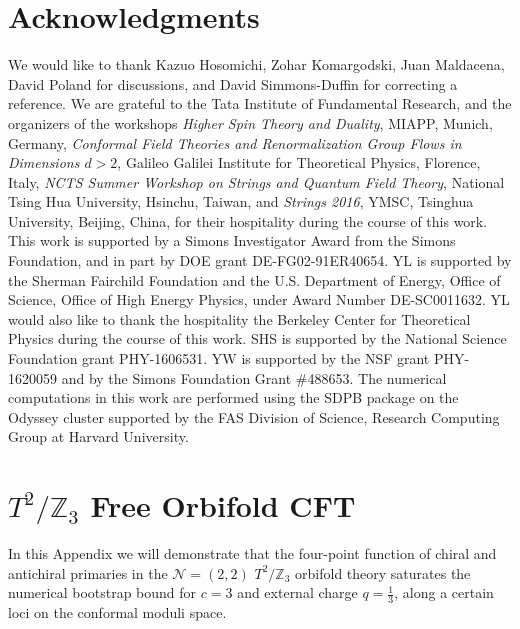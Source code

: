 \documentclass[12pt]{article}
\begin{document}
\section*{Acknowledgments} 



We would like to thank Kazuo Hosomichi, Zohar Komargodski, Juan Maldacena, David Poland for discussions, and David Simmons-Duffin for correcting a reference. 
We are grateful to the Tata Institute of Fundamental Research, and the organizers of the workshops {\it Higher Spin Theory and Duality}, MIAPP, Munich, Germany, {\it Conformal Field Theories and Renormalization Group Flows in Dimensions $d>2$}, Galileo Galilei Institute for Theoretical Physics, Florence, Italy, {\it NCTS Summer Workshop on Strings and Quantum Field Theory}, National Tsing Hua University, Hsinchu, Taiwan, and {\it Strings 2016}, YMSC, Tsinghua University, Beijing, China, for their hospitality during the course of this work. This work is supported by a Simons Investigator Award from the Simons Foundation, and in part by DOE grant DE-FG02-91ER40654. YL is supported by the Sherman Fairchild Foundation and the U.S. Department of Energy, Office of Science, Office of High Energy Physics, under
Award Number DE-SC0011632. YL would also like to thank the hospitality the Berkeley Center for Theoretical Physics during the course of this work. SHS is supported by the National Science Foundation grant PHY-1606531. YW is supported by the NSF grant PHY-1620059 and by the Simons Foundation Grant \#488653. The numerical computations in this work are performed using the SDPB package \cite{Simmons-Duffin:2015qma} on the Odyssey cluster supported by the FAS Division of Science, Research Computing Group at Harvard University.







\appendix



\section{$T^2/\mathbb{Z}_3$ Free Orbifold CFT}
\label{Sec:T2Z3}

In this Appendix we will demonstrate that the four-point function of chiral and antichiral primaries in the $\mathcal{N}=(2,2)$ $T^2/\mathbb{Z}_3$ orbifold theory saturates the numerical bootstrap bound for $c=3$ and external charge $q=\frac13$, along a certain loci on the conformal moduli space.
\end{document}
